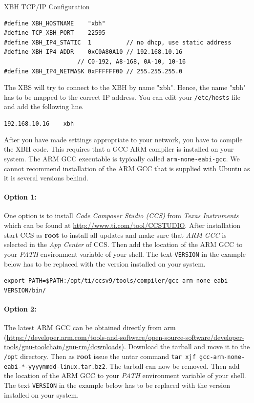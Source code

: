 \documentclass[twoside,11pt]{cergdoc}
\begin{document}
\begin{cergbox}{XBH TCP/IP Configuration}
\begin{lstlisting}
#define XBH_HOSTNAME    "xbh"
#define TCP_XBH_PORT    22595
#define XBH_IP4_STATIC  1          // no dhcp, use static address
#define XBH_IP4_ADDR    0xC0A80A10 // 192.168.10.16   
                     // C0-192, A8-168, 0A-10, 10-16
#define XBH_IP4_NETMASK 0xFFFFFF00 // 255.255.255.0
\end{lstlisting}
\end{cergbox}

The XBS will try to connect to the XBH by name "xbh". Hence, the name "xbh" has to 
be mapped to the correct IP address. You can edit your \verb|/etc/hosts| file
and add the following line.

\begin{center}
\verb|192.168.10.16    xbh|
\end{center}

After you have made settings appropriate to your network, you have to compile
the XBH code. This requires that a GCC ARM compiler is installed on your system.
The ARM GCC executable is typically called \texttt{arm-none-eabi-gcc}. We cannot 
recommend installation of the ARM GCC that is supplied with Ubuntu as it is several 
versions behind.

\paragraph{Option 1:}
One option is to install \emph{Code Composer Studio (CCS)} from \emph{Texas Instruments}
which can be found at \url{http://www.ti.com/tool/CCSTUDIO}. After installation
start CCS as \textbf{root} to install all updates and make sure that 
\emph{ARM GCC} is selected in the \emph{App Center} of CCS. Then add the location
of the ARM GCC to your \emph{PATH} environment variable of your shell. The text 
\texttt{VERSION} in the example below has to be replaced with the version installed
on your system. 

\begin{center}
\lstinline|export PATH=$PATH:/opt/ti/ccsv9/tools/compiler/gcc-arm-none-eabi-VERSION/bin/| 
\end{center}

\paragraph{Option 2:}
The latest ARM GCC can be obtained directly from arm (\url{https://developer.arm.com/tools-and-software/open-source-software/developer-tools/gnu-toolchain/gnu-rm/downloads}). Download the tarball and move it to 
the \verb|/opt| directory. Then as \textbf{root} issue the untar command
\verb|tar xjf gcc-arm-none-eabi-*-yyyymmdd-linux.tar.bz2|. The tarball can now be 
removed.  Then add the location
of the ARM GCC to your \emph{PATH} environment variable of your shell. The text 
\texttt{VERSION} in the example below has to be replaced with the version installed
on your system. 
\end{document}
